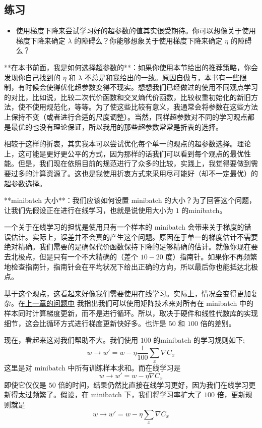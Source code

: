 \subsection*{练习}

\begin{itemize}
\item 使用梯度下降来尝试学习好的超参数的值其实很受期待。你可以想像关于使用梯度下降来确定 $\lambda$ 的障碍么？你能够想象关于使用梯度下降来确定 $\eta$ 的障碍么？
\end{itemize}

**在本书前面，我是如何选择超参数的**：如果你使用本节给出的推荐策略，你会发现你自己找到的 $\eta$ 和 $\lambda$ 不总是和我给出的一致。原因自傲与，本书有一些限制，有时候会使得优化超参数变得不现实。想想我们已经做过的使用不同观点学习的对比，比如说，比较二次代价函数和交叉熵代价函数，比较权重初始化的新旧方法，使不使用规范化，等等。为了使这些比较有意义，我通常会将参数在这些方法上保持不变（或者进行合适的尺度调整）。当然，同样超参数对不同的学习观点都是最优的也没有理论保证，所以我用的那些超参数常常是折衷的选择。

相较于这样的折衷，其实我本可以尝试优化每个单一的观点的超参数选择。理论上，这可能是更好更公平的方式，因为那样的话我们可以看到每个观点的最优性能。但是，我们现在依照目前的规范进行了众多的比较，实践上，我觉得要做到需要过多的计算资源了。这也是我使用折衷方式来采用尽可能好（却不一定最优）的超参数选择。

**minibatch 大小**：我们应该如何设置 minibatch 的大小？为了回答这个问题，让我们先假设正在进行在线学习，也就是说使用大小为 $1$ 的minibatch。

一个关于在线学习的担忧是使用只有一个样本的 minibatch 会带来关于梯度的错误估计。实际上，误差并不会真的产生这个问题。原因在于单一的梯度估计不需要绝对精确。我们需要的是确保代价函数保持下降的足够精确的估计。就像你现在要去北极点，但是只有一个不大精确的（差个 $10-20$ 度）指南针。如果你不再频繁地检查指南针，指南针会在平均状况下给出正确的方向，所以最后你也能抵达北极点。

基于这个观点，这看起来好像我们需要使用在线学习。实际上，情况会变得更加复杂。在\hyperref[ch:]{上一章的问题中} 我指出我们可以使用矩阵技术来对所有在 minibatch 中的样本同时计算梯度更新，而不是进行循环。所以，取决于硬件和线性代数库的实现细节，这会比循环方式进行梯度更新快好多。也许是 $50$ 和 $100$ 倍的差别。

现在，看起来这对我们帮助不大。我们使用 $100$ 的minibatch 的学习规则如下;
\begin{equation}
  w \rightarrow w' = w-\eta \frac{1}{100} \sum_x \nabla C_x
  \label{eq:100}\tag{100}
\end{equation}
这里是对 minibatch 中所有训练样本求和。而在线学习是
\begin{equation}
  w \rightarrow w' = w-\eta \nabla C_x
  \label{eq:101}\tag{101}
\end{equation}
即使它仅仅是 $50$ 倍的时间，结果仍然比直接在线学习更好，因为我们在线学习更新得太过频繁了。假设，在 minibatch 下，我们将学习率扩大了 $100$ 倍，更新规则就是
\begin{equation}
  w \rightarrow w' = w-\eta \sum_x \nabla C_x
  \label{eq:102}\tag{102}
\end{equation}

